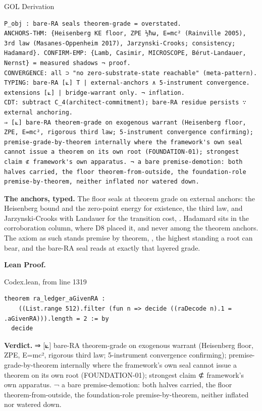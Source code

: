 \documentclass[10pt,twocolumn]{article}
\begin{document}
\begin{golbox}{GOL Derivation}
\begin{lstlisting}[style=golv]
P_obj : bare-RA seals theorem-grade = overstated.
ANCHORS-THM: {Heisenberg KE floor, ZPE ½ħω, E=mc² (Rainville 2005), 3rd law (Masanes-Oppenheim 2017), Jarzynski-Crooks; consistency; Hadamard}. CONFIRM-EMP: {Lamb, Casimir, MICROSCOPE, Bérut-Landauer, Nernst} = measured shadows ¬ proof.
CONVERGENCE: all ⊃ "no zero-substrate-state reachable" (meta-pattern).
TYPING: bare-RA [⟀] T | external-anchors ∧ 5-instrument convergence. extensions [⟀] | bridge-warrant only. ¬ inflation.
CDT: subtract C_4(architect-commitment); bare-RA residue persists ∵ external anchoring.
⇒ [⟀] bare-RA theorem-grade on exogenous warrant (Heisenberg floor, ZPE, E=mc², rigorous third law; 5-instrument convergence confirming); premise-grade-by-theorem internally where the framework's own seal cannot issue a theorem on its own root (FOUNDATION-01); strongest claim ⊄ framework's own apparatus. ¬ a bare premise-demotion: both halves carried, the floor theorem-from-outside, the foundation-role premise-by-theorem, neither inflated nor watered down.
\end{lstlisting}
\end{golbox}

\textbf{The anchors, typed.} The floor seals at theorem grade on
external anchors: the Heisenberg bound and the zero-point energy for
existence, the third law, and Jarzynski-Crooks with Landauer for the
transition cost, \texttt{}. Hadamard
sits in the corroboration column, where D8 placed it, and never among
the theorem anchors. The axiom as such stands premise by theorem,
\texttt{}, the highest standing a
root can bear, and the bare-RA seal reads at exactly that layered grade.

\textbf{Lean Proof.}

\begin{leanexcerpt}{Codex.lean, from line 1319}
\begin{lstlisting}[style=leanx,firstnumber=1319]
theorem ra_ledger_aGivenRA :
    ((List.range 512).filter (fun n => decide ((raDecode n).1 = .aGivenRA))).length = 2 := by
  decide
\end{lstlisting}
\end{leanexcerpt}

\textbf{Verdict.} ⇒ {[}⟀{]} bare-RA theorem-grade on exogenous warrant
(Heisenberg floor, ZPE, E=mc², rigorous third law; 5-instrument
convergence confirming); premise-grade-by-theorem internally where the
framework's own seal cannot issue a theorem on its own root
(FOUNDATION-01); strongest claim ⊄ framework's own apparatus. ¬ a bare
premise-demotion: both halves carried, the floor theorem-from-outside,
the foundation-role premise-by-theorem, neither inflated nor watered
down.
\end{document}
